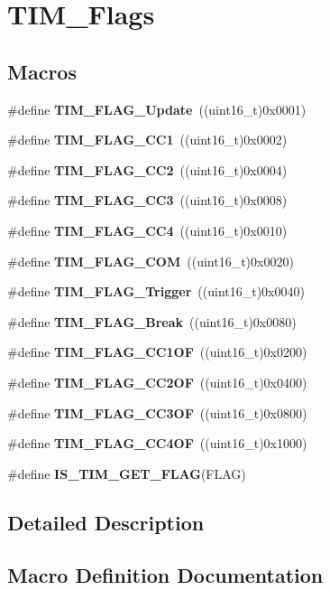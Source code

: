 \section{T\+I\+M\+\_\+\+Flags}
\label{group__TIM__Flags}
\subsection*{Macros}
\begin{DoxyCompactItemize}
\item 
\#define \textbf{ T\+I\+M\+\_\+\+F\+L\+A\+G\+\_\+\+Update}~((uint16\+\_\+t)0x0001)
\item 
\#define \textbf{ T\+I\+M\+\_\+\+F\+L\+A\+G\+\_\+\+C\+C1}~((uint16\+\_\+t)0x0002)
\item 
\#define \textbf{ T\+I\+M\+\_\+\+F\+L\+A\+G\+\_\+\+C\+C2}~((uint16\+\_\+t)0x0004)
\item 
\#define \textbf{ T\+I\+M\+\_\+\+F\+L\+A\+G\+\_\+\+C\+C3}~((uint16\+\_\+t)0x0008)
\item 
\#define \textbf{ T\+I\+M\+\_\+\+F\+L\+A\+G\+\_\+\+C\+C4}~((uint16\+\_\+t)0x0010)
\item 
\#define \textbf{ T\+I\+M\+\_\+\+F\+L\+A\+G\+\_\+\+C\+OM}~((uint16\+\_\+t)0x0020)
\item 
\#define \textbf{ T\+I\+M\+\_\+\+F\+L\+A\+G\+\_\+\+Trigger}~((uint16\+\_\+t)0x0040)
\item 
\#define \textbf{ T\+I\+M\+\_\+\+F\+L\+A\+G\+\_\+\+Break}~((uint16\+\_\+t)0x0080)
\item 
\#define \textbf{ T\+I\+M\+\_\+\+F\+L\+A\+G\+\_\+\+C\+C1\+OF}~((uint16\+\_\+t)0x0200)
\item 
\#define \textbf{ T\+I\+M\+\_\+\+F\+L\+A\+G\+\_\+\+C\+C2\+OF}~((uint16\+\_\+t)0x0400)
\item 
\#define \textbf{ T\+I\+M\+\_\+\+F\+L\+A\+G\+\_\+\+C\+C3\+OF}~((uint16\+\_\+t)0x0800)
\item 
\#define \textbf{ T\+I\+M\+\_\+\+F\+L\+A\+G\+\_\+\+C\+C4\+OF}~((uint16\+\_\+t)0x1000)
\item 
\#define \textbf{ I\+S\+\_\+\+T\+I\+M\+\_\+\+G\+E\+T\+\_\+\+F\+L\+AG}(F\+L\+AG)
\end{DoxyCompactItemize}


\subsection{Detailed Description}


\subsection{Macro Definition Documentation}
\mbox{\label{group__TIM__Flags_ga6406de8131ae53ee29740c3e8627b098}} 

